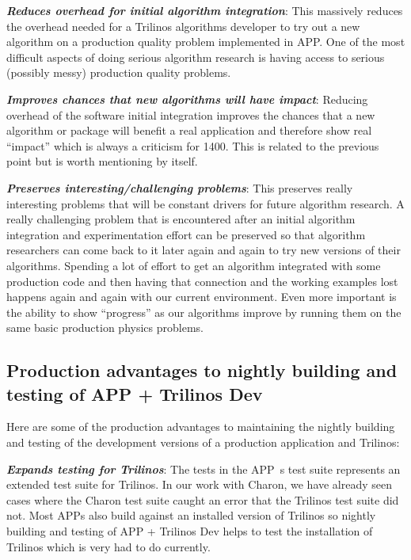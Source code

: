 \documentclass[pdf,ps2pdf,11pt]{SANDreport}
\begin{document}
{}\textit{\textbf{Reduces overhead for initial algorithm integration}}: This
massively reduces the overhead needed for a Trilinos algorithms developer to
try out a new algorithm on a production quality problem implemented in APP.
One of the most difficult aspects of doing serious algorithm research is
having access to serious (possibly messy) production quality problems.

{}\textit{\textbf{Improves chances that new algorithms will have impact}}:
Reducing overhead of the software initial integration improves the chances
that a new algorithm or package will benefit a real application and therefore
show real ``impact'' which is always a criticism for 1400.  This is related to
the previous point but is worth mentioning by itself.

{}\textit{\textbf{Preserves interesting/challenging problems}}: This preserves
really interesting problems that will be constant drivers for future algorithm
research.  A really challenging problem that is encountered after an initial
algorithm integration and experimentation effort can be preserved so that
algorithm researchers can come back to it later again and again to try new
versions of their algorithms.  Spending a lot of effort to get an algorithm
integrated with some production code and then having that connection and the
working examples lost happens again and again with our current environment.
Even more important is the ability to show ``progress'' as our algorithms
improve by running them on the same basic production physics problems.


%
{}\subsection{Production advantages to nightly building and testing of APP +
Trilinos Dev}
%

Here are some of the production advantages to maintaining the nightly building
and testing of the development versions of a production application and
Trilinos:

{}\textit{\textbf{Expands testing for Trilinos}}: The tests in the APP~s test
suite represents an extended test suite for Trilinos.  In our work with
Charon, we have already seen cases where the Charon test suite caught an error
that the Trilinos test suite did not.  Most APPs also build against an
installed version of Trilinos so nightly building and testing of APP +
Trilinos Dev helps to test the installation of Trilinos which is very had to
do currently.
\end{document}
